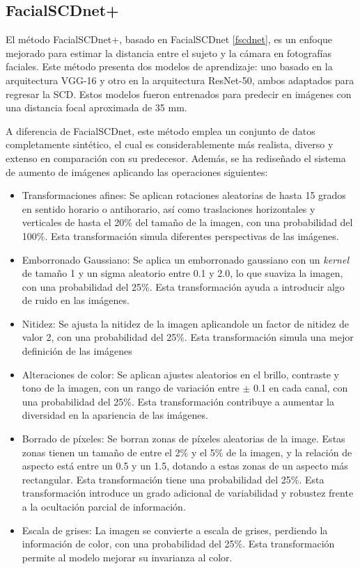 \subsection{FacialSCDnet+}

El método FacialSCDnet+, basado en FacialSCDnet \ref{fscdnet}, es un enfoque mejorado para estimar la distancia entre el sujeto y la cámara en fotografías faciales. Este método presenta dos modelos de aprendizaje: uno basado en la arquitectura VGG-16 y otro en la arquitectura ResNet-50, ambos adaptados para regresar la SCD. Estos modelos fueron entrenados para predecir en imágenes con una distancia focal aproximada de 35 mm.

A diferencia de FacialSCDnet, este método emplea un conjunto de datos completamente sintético, el cual es considerablemente más realista, diverso y extenso en comparación con su predecesor. Además, se ha rediseñado el sistema de aumento de imágenes aplicando las operaciones siguientes:

\begin{itemize}
	\item Transformaciones afines: Se aplican rotaciones aleatorias de hasta 15 grados en sentido horario o antihorario, así como traslaciones horizontales y verticales de hasta el 20\% del tamaño de la imagen, con una probabilidad del 100\%. Esta transformación simula diferentes perspectivas de las imágenes.
	\item Emborronado Gaussiano: Se aplica un emborronado gaussiano con un \textit{kernel} de tamaño 1 y un sigma aleatorio entre 0.1 y 2.0, lo que suaviza la imagen, con una probabilidad del 25\%. Esta transformación ayuda a introducir algo de ruido en las imágenes.
	\item Nitidez: Se ajusta la nitidez de la imagen aplicandole un factor de nitidez de valor 2, con una probabilidad del 25\%. Esta transformación simula una mejor definición de las imágenes
	\item Alteraciones de color: Se aplican ajustes aleatorios en el brillo, contraste y tono de la imagen, con un rango de variación entre $\pm$ 0.1 en cada canal, con una probabilidad del 25\%. Esta transformación contribuye a aumentar la diversidad en la apariencia de las imágenes.
	\item Borrado de píxeles: Se borran zonas de píxeles aleatorias de la image. Estas zonas tienen un tamaño de entre el 2\% y el 5\% de la imagen, y la relación de aspecto está entre un 0.5 y un 1.5, dotando a estas zonas de un aspecto más rectangular. Esta transformación tiene una probabilidad del 25\%. Esta transformación introduce un grado adicional de variabilidad y robustez frente a la ocultación parcial de información.
	\item Escala de grises: La imagen se convierte a escala de grises, perdiendo la información de color, con una probabilidad del 25\%. Esta transformación permite al modelo mejorar su invarianza al color.
\end{itemize}

